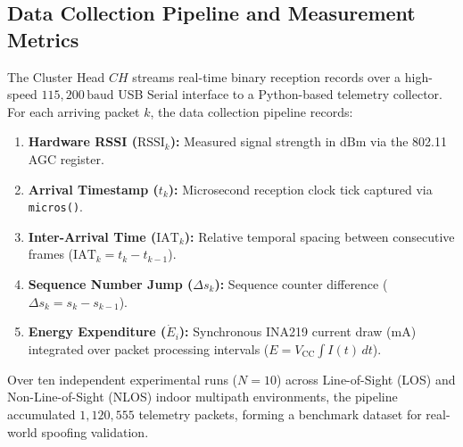 \subsection{Data Collection Pipeline and Measurement Metrics}
The Cluster Head $CH$ streams real-time binary reception records over a high-speed $115,200\,\text{baud}$ USB Serial interface to a Python-based telemetry collector. For each arriving packet $k$, the data collection pipeline records:
\begin{enumerate}
    \item \textbf{Hardware RSSI ($\text{RSSI}_k$):} Measured signal strength in $\text{dBm}$ via the 802.11 AGC register.
    \item \textbf{Arrival Timestamp ($t_k$):} Microsecond reception clock tick captured via \texttt{micros()}.
    \item \textbf{Inter-Arrival Time ($\text{IAT}_k$):} Relative temporal spacing between consecutive frames ($\text{IAT}_k = t_k - t_{k-1}$).
    \item \textbf{Sequence Number Jump ($\Delta s_k$):} Sequence counter difference ($\Delta s_k = s_k - s_{k-1}$).
    \item \textbf{Energy Expenditure ($\dot{E}_i$):} Synchronous INA219 current draw ($\text{mA}$) integrated over packet processing intervals ($E = V_{\text{CC}} \int I(t) \, dt$).
\end{enumerate}

Over ten independent experimental runs ($N = 10$) across Line-of-Sight (\ac{LOS}) and Non-Line-of-Sight (\ac{NLOS}) indoor multipath environments, the pipeline accumulated $1,120,555$ telemetry packets, forming a benchmark dataset for real-world spoofing validation.
